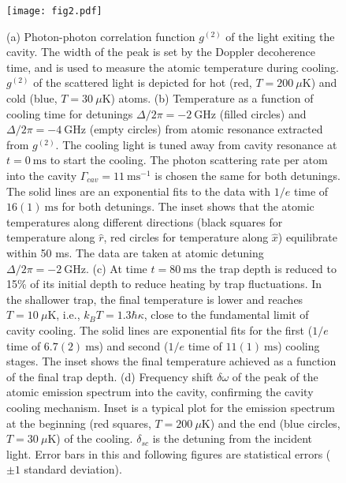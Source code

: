 \documentclass[aps,prl,superscriptaddress,onecloumn,nobibnotes]{revtex4-1}
\begin{document}
\begin{figure}[!th]
\centerline{\texttt{[image: fig2.pdf]}}
\caption{ (a) Photon-photon correlation function $g^{(2)}$ of the light exiting the cavity. The width of the peak is set by the Doppler decoherence time, and is used to measure the atomic temperature during cooling.  $g^{(2)}$ of the scattered light is depicted for hot (red, $T=200~\mu$K) and cold (blue, $T=30~\mu$K) atoms. 
(b) Temperature as a function of cooling time for detunings $\Delta/2\pi=-2~ \mathrm{GHz}$ (filled circles) and $\Delta/2\pi=-4 ~\mathrm{GHz}$ (empty circles) 
from atomic resonance extracted from $g^{(2)}$. 
The cooling light is tuned away from cavity resonance at $t=0~ \mathrm{ms}$ to start the cooling. The photon scattering rate per atom into the cavity $\Gamma_{cav}=11 ~\mathrm{ms}^{-1}$ is chosen the same for both detunings. The solid lines are an exponential fits to the data with $1/e$ time of $16(1)~\mathrm{ms}$ for both detunings. 
The inset shows that the atomic temperatures along different directions (black squares for temperature along $\hat{r}$, red circles for temperature along $\hat{x}$) equilibrate within 50 ms. The data are taken at atomic detuning $\Delta/2\pi=-2~\mathrm{GHz}$.
(c)  At time $t=80 ~\mathrm{ms}$ the trap depth is reduced to 15\% of its initial depth to reduce heating by trap fluctuations. In the shallower trap, the final temperature is lower and reaches $T=10  ~\mu$K, i.e., $k_B T=1.3\hbar\kappa$, close to the fundamental limit of cavity cooling. The solid lines are exponential fits for the first ($1/e$ time of $6.7(2) ~\mathrm{ms}$) and second ($1/e$ time of $11(1) ~\mathrm{ms}$) cooling stages. The inset shows the final temperature achieved as a function of the final trap depth.
(d) Frequency shift $\delta \omega$ of the peak of the atomic emission spectrum into the cavity, confirming the cavity cooling mechanism. Inset is a typical plot for the emission spectrum at the beginning (red squares, $T=200~\mu$K) and the end (blue circles, $T=30~\mu$K) of the cooling. $\delta_{sc}$ is the detuning from the incident light. 
 Error bars in this and following figures are statistical errors ($\pm 1$ standard deviation).
}
\label{fig2}
\end{figure}

\end{document}
